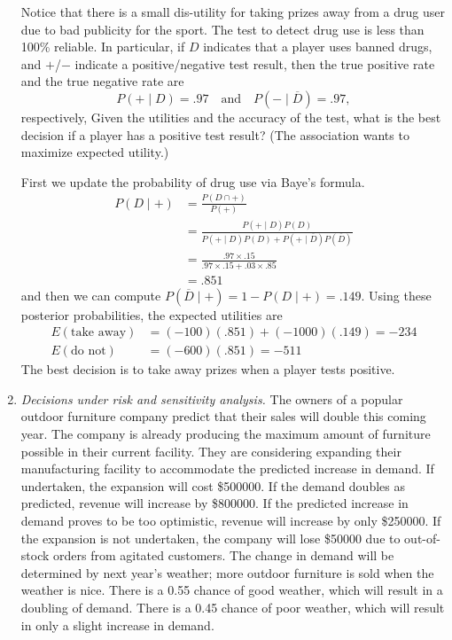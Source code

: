 \begin{enumerate}
Notice that there is a small dis-utility for taking prizes away from a drug user
due to bad publicity for the sport. The test to detect drug use is
less than 100\% reliable. In particular, if $D$ indicates that a 
player uses banned drugs, and $+$/$-$ indicate a positive/negative
test result, then the true positive rate and the true negative rate
are
\[
P(+ \mid D) = .97 \quad \text{and} \quad P(- \mid \overline{D}) = .97,
\]
respectively, Given the utilities and the accuracy of the test, what is the best
decision if a player has a positive test result? (The association
wants to maximize expected utility.)

\begin{solution}
\bs First we update the probability of drug use via Baye's formula.
\begin{align*}
P(D \mid +) &= \frac{P(D \cap +)}{P(+)} \\
&= \frac{P(+ \mid D)P(D)}{P(+ \mid D)P(D) + P(+ \mid \overline{D})P(\overline{D})} \\
&= \frac{.97 \times .15}{.97 \times .15 + .03 \times .85} \\
&= .851
\end{align*}
and then we can compute $P(\overline{D} \mid +) = 1 - P(D \mid +) = .149$.
Using these posterior probabilities, the expected utilities are
\begin{align*}
E(\text{take away}) &= (-100)(.851) + (-1000)(.149) = -234 \\
E(\text{do not}) &= (-600)(.851) = -511
\end{align*}
The best decision is to take away prizes when a player tests positive.
\end{solution}

\item \emph {Decisions under risk and sensitivity analysis.}  The
  owners of a popular outdoor furniture company predict that their
  sales will double this coming year. The company is already producing
  the maximum amount of furniture possible in their current
  facility. They are considering expanding their manufacturing
  facility to accommodate the predicted increase in demand. If
  undertaken, the expansion will cost \$\num{500000}. If the demand
  doubles as predicted, revenue will increase by \$\num{800000}.  If
  the predicted increase in demand proves to be too optimistic,
  revenue will increase by only \$\num{250000}.  If the expansion is
  not undertaken, the company will lose \$\num{50000} due to
  out-of-stock orders from agitated customers.  The change in demand
  will be determined by next year's weather; more outdoor furniture is
  sold when the weather is nice.  There is a 0.55 chance of good
  weather, which will result in a doubling of demand. There is a 0.45
  chance of poor weather, which will result in only a slight increase
  in demand.


\end{enumerate}
